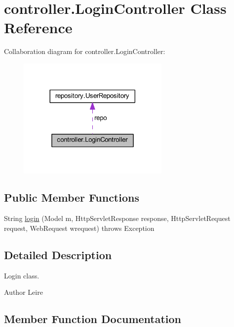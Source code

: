 \hypertarget{classcontroller_1_1_login_controller}{}\section{controller.\+Login\+Controller Class Reference}
\label{classcontroller_1_1_login_controller}


Collaboration diagram for controller.\+Login\+Controller\+:\nopagebreak
\begin{figure}[H]
\begin{center}
\leavevmode
\includegraphics[width=209pt]{classcontroller_1_1_login_controller__coll__graph}
\end{center}
\end{figure}
\subsection*{Public Member Functions}
\begin{DoxyCompactItemize}
\item 
String \mbox{\hyperlink{classcontroller_1_1_login_controller_a98e670c0e2a6a391f1b5b9cb451aedeb}{login}} (Model m, Http\+Servlet\+Response response, Http\+Servlet\+Request request, Web\+Request wrequest)  throws Exception 
\end{DoxyCompactItemize}


\subsection{Detailed Description}
Login class.

\begin{DoxyAuthor}{Author}
Leire 
\end{DoxyAuthor}


\subsection{Member Function Documentation}
\mbox{\label{classcontroller_1_1_login_controller_a98e670c0e2a6a391f1b5b9cb451aedeb}} 
